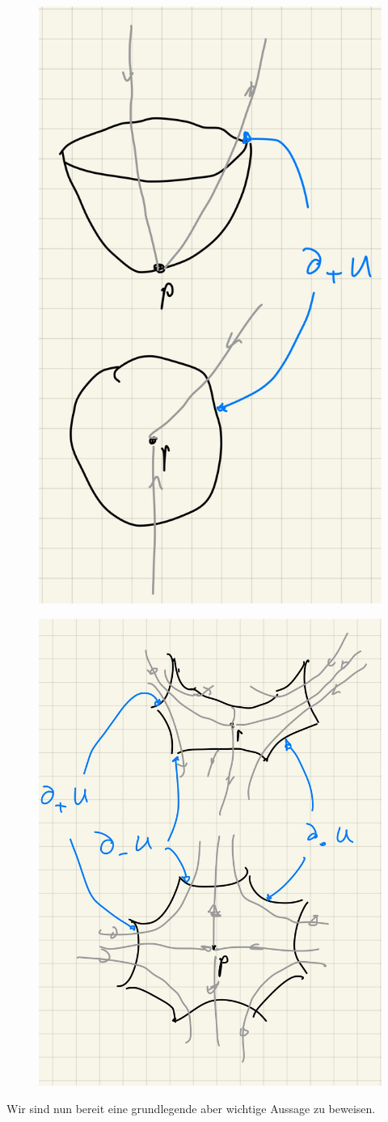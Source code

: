 \begin{definition}
    \begin{figure}[h]
        \centering
        \begin{minipage}{.4\textwidth}
          \centering
          \includegraphics[width=.4\linewidth]{../resources/def-notation-morse-umgebung-1.JPG}
          \label{fig: morse umgebung ind 0}
        \end{minipage}%
        \begin{minipage}{.4\textwidth}
          \centering
          \includegraphics[width=.4\linewidth]{../resources/def-notation-morse-umgebung-2.JPG}
          \label{fig: morse umgebung ind k}
        \end{minipage}
    \end{figure}
\end{definition}

Wir sind nun bereit eine grundlegende aber wichtige Aussage zu beweisen.


